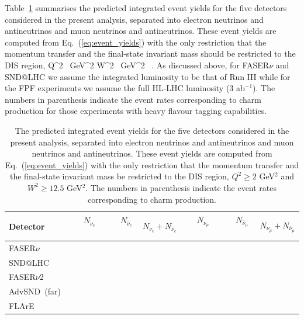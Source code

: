 Table~\ref{tab:integrated_rates} summarises the predicted integrated event yields for the five detectors considered
  in the present analysis, separated into electron neutrinos and antineutrinos
  and muon neutrinos and antineutrinos.
  These event yields are computed from Eq.~(\ref{eq:event_yields}) with the only
  restriction that the momentum transfer and the final-state invariant mass should be restricted
  to the DIS region,
  \be
  \label{eq:DISconditions}
Q^2 ~{\rm GeV}^2 W^2 ~{\rm GeV}^2 \, .
\ee
  As discussed above, for FASER$\nu$ and SND@LHC we assume the integrated luminosity to
  be that of Run III while for the FPF experiments we assume the full HL-LHC
  luminosity (3 ab$^{-1}$).
   The numbers in parenthesis indicate the event rates corresponding to charm
  production for those experiments with heavy flavour tagging capabilities.

\begin{table}[t]
  \centering
  \small
  \renewcommand{\arraystretch}{1.60}
\begin{tabularx}{\textwidth}{X|c|c|c|c|c|c}
\toprule
Detector & $\quad$ $N_{\nu_e}$ $\quad$ &$\quad$ $N_{\bar{\nu}_e}$$\quad$   &   $N_{\nu_e} + N_{\bar{\nu}_e}$ &
$\quad$$N_{\nu_\mu}$ $\quad$ & $\quad$ $N_{\bar{\nu}_\mu}$ $\quad$  &   $N_{\nu_\mu} + N_{\bar{\nu}_\mu}$ \\
\midrule
FASER$\nu$  &    &    &   &   &    &    \\
SND@LHC  &    &    &   &   &    &    \\
\midrule
FASER$\nu$2  &    &    &   &   &    &    \\
AdvSND~(far)  &    &    &   &   &    &    \\
FLArE &    &    &   &   &    &    \\
  \bottomrule
\end{tabularx}
\vspace{0.2cm}
\caption{\small The predicted integrated event yields for the five detectors considered
  in the present analysis, separated into electron neutrinos and antineutrinos
  and muon neutrinos and antineutrinos.
  These event yields are computed from Eq.~(\ref{eq:event_yields}) with the only
  restriction that the momentum transfer and the final-state invariant mass be restricted
  to the DIS region, $Q^2 \ge 2$ GeV$^2$ and $W^2 \ge 12.5$ GeV$^2$.
  The numbers in parenthesis indicate the event rates corresponding to charm
  production.
  \label{tab:integrated_rates}
}
\end{table}

